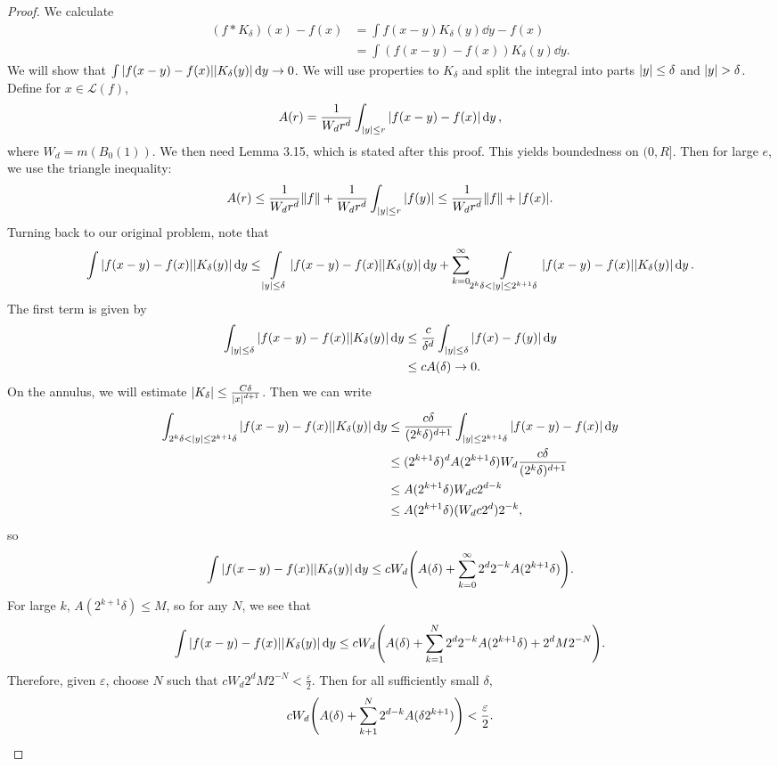 \documentclass[leqno, openany]{memoir}
\theoremstyle{definition}
\theoremstyle{remark}
\theoremstyle{plain}
\theoremstyle{definition}
\theoremstyle{remark}
\newcommand{\ep}{\varepsilon}
\newcommand{\mc}[1]{\mathcal{#1}}
\begin{document}
\begin{proof} We calculate \begin{align*} (f * K_{\delta})(x) - f(x) &= \int
f(x-y) K_{\delta}(y) \dd{y} - f(x) \\ &= \int (f(x-y) - f(x)) K_{\delta}(y)
\dd{y}.  \end{align*} We will show that $\int \abs{f(x-y) - f(x)}
\abs{K_{\delta}(y)} \dd{y} \to 0$. We will use properties to $K_{\delta}$ and
split the integral into parts $\abs{y} \leq \delta$ and $\abs{y} > \delta$.
Define for $x \in \mc{L}(f)$, \[ A(r) = \frac{1}{W_d r^d} \int_{\abs{y} \leq r}
\abs{f(x-y) - f(x)} \dd{y}, \] where $W_d = m(B_0(1))$. We then need Lemma
3.15, which is stated after this proof. This yields boundedness on $(0,R]$.
Then for large $e$, we use the triangle inequality: \[ A(r) \leq
\frac{1}{W_dr^d} \norm{f} + \frac{1}{W_dr^d} \int_{\abs{y} \leq r} \abs{f(y)}
\leq \frac{1}{W_dr^d} \norm{f} + \abs{f(x)}. \] Turning back to our original
problem, note that \[ \int \abs{f(x-y) - f(x)} \abs{K_{\delta}(y)} \dd{y} \leq
\int\displaylimits_{\abs{y} \leq \delta} \abs{f(x-y) - f(x)}
\abs{K_{\delta}(y)} \dd{y} + \sum_{k=0}^{\infty} \int\displaylimits_{2^k \delta
< \abs{y} \leq 2^{k+1} \delta} \abs{f(x-y) - f(x)} \abs{K_{\delta}(y)} \dd{y}.
\] The first term is given by \begin{align*} \int_{\abs{y} \leq \delta}
\abs{f(x-y) - f(x)} \abs{K_{\delta}(y)} \dd{y} &\leq \frac{c}{\delta^d}
\int_{\abs{y} \leq \delta} \abs{f(x) - f(y)} \dd{y} \\ &\leq c A(\delta) \to 0.
\end{align*} On the annulus, we will estimate $\abs{K_{\delta}} \leq \frac{C
\delta}{\abs{x}^{d+1}}$. Then we can write \begin{align*} \int_{2^k \delta <
\abs{y} \leq 2^{k+1} \delta} \abs{f(x-y) - f(x)} \abs{K_{\delta}(y)} \dd{y}
&\leq \frac{c \delta}{(2^k \delta)^{d+1}} \int_{\abs{y} \leq 2^{k+1} \delta}
\abs{f(x-y) - f(x)} \dd{y} \\ &\leq (2^{k+1} \delta)^d A(2^{k+1}\delta) W_d
\frac{c \delta}{(2^k\delta)^{d+1}} \\ &\leq A(2^{k+1}\delta)W_d c 2^{d-k} \\
                                      &\leq A(2^{k+1}\delta)(W_d c 2^d)2^{-k},
\end{align*} so \[ \int \abs{f(x-y) - f(x)} \abs{K_{\delta}(y)} \dd{y} \leq c
W_d \qty(A(\delta) + \sum_{k=0}^{\infty} 2^d 2^{-k}A(2^{k+1} \delta)). \] For
large $k$, $A(2^{k+1}\delta) \leq M$, so for any $N$, we see that \[ \int
\abs{f(x-y)-f(x)}\abs{K_{\delta}(y)} \dd{y} \leq cW_d \qty(A(\delta) +
\sum_{k=1}^N 2^d 2^{-k} A(2^{k+1}\delta) + 2^dM2^{-N}). \] Therefore, given
$\ep$, choose $N$ such that $c W_d 2^d M 2^{-N} < \frac{\ep}{2}$. Then for all
sufficiently small $\delta$, \[ c W_d \qty(A(\delta) + \sum_{k+1}^N
2^{d-k}A(\delta 2^{k+1})) < \frac{\ep}{2}. \qedhere \] \end{proof}
\end{document}
